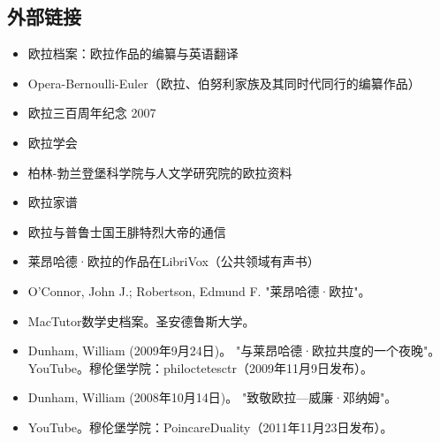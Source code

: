 \subsection{外部链接} 
\begin{itemize}
\item 欧拉档案：欧拉作品的编纂与英语翻译  
\item Opera-Bernoulli-Euler（欧拉、伯努利家族及其同时代同行的编纂作品）  
\item 欧拉三百周年纪念 2007  
\item 欧拉学会  
\item 柏林-勃兰登堡科学院与人文学研究院的欧拉资料  
\item 欧拉家谱  
\item 欧拉与普鲁士国王腓特烈大帝的通信  
\item 莱昂哈德·欧拉的作品在LibriVox（公共领域有声书）  
\item O'Connor, John J.; Robertson, Edmund F. "莱昂哈德·欧拉"。\item MacTutor数学史档案。圣安德鲁斯大学。  
\item Dunham, William (2009年9月24日)。 "与莱昂哈德·欧拉共度的一个夜晚"。YouTube。穆伦堡学院：philoctetesctr（2009年11月9日发布）。  
\item Dunham, William (2008年10月14日)。 "致敬欧拉—威廉·邓纳姆"。\item YouTube。穆伦堡学院：PoincareDuality（2011年11月23日发布）。
\end{itemize}